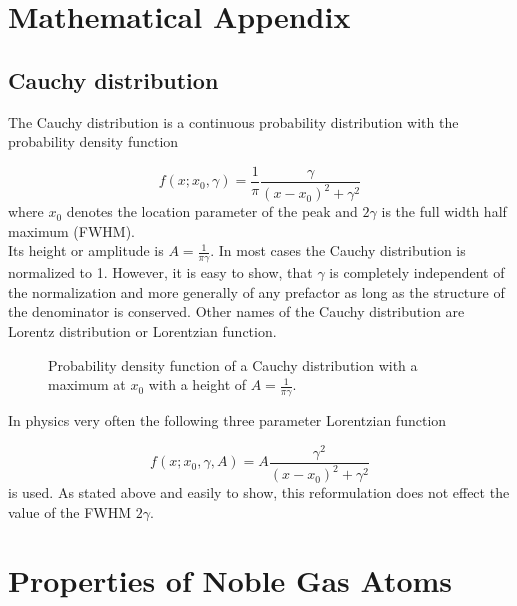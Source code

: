 \begin{appendix}

\chapter{Mathematical Appendix}
\section{Cauchy distribution} \label{section:app_cauchy}
The Cauchy distribution is a continuous probability distribution
with the probability density function

\begin{equation}
  f(x;x_0,\gamma) = \frac 1\pi \frac{\gamma}{(x-x_0)^2 + \gamma^2}
\end{equation}
where $x_0$ denotes the location parameter of the peak and
$2 \gamma$ is the full width half maximum (FWHM).\\
Its height or amplitude is $A = \frac{1}{\pi\gamma}$.
In most cases the
Cauchy distribution is normalized to 1. However, it is easy to show,
that $\gamma$ is completely
independent of the normalization and more generally of any prefactor
as long as the structure of the denominator is conserved.
Other names of the Cauchy distribution are Lorentz distribution or
Lorentzian function.


\begin{figure}[h]
  \centering
  
  \caption{Probability density function of a Cauchy distribution with a
           maximum at $x_0$ with a height of $A=\frac{1}{\pi\gamma}$.}
  \label{figure:cauchy_distribution}
\end{figure}


In physics very often the following three parameter Lorentzian function

\begin{equation}
  f(x;x_0,\gamma,A) = A \frac{\gamma^2}{(x-x_0)^2 + \gamma^2}
\end{equation}
is used. As stated above and easily to show, this reformulation does
not effect the value of the FWHM $2 \gamma$.



\chapter{Properties of Noble Gas Atoms}


\end{appendix}
